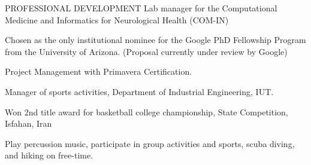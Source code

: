 \documentclass{resume} %
\begin{document}
%




\begin{rSection}{PROFESSIONAL DEVELOPMENT} \itemsep -4pt
Lab manager for the Computational Medicine and Informatics for Neurological Health (COM-IN)
\item Chosen as the only institutional nominee for the Google PhD Fellowship Program from the University of Arizona. (Proposal currently under review by Google)
\item Project Management with Primavera Certification.
\item Manager of sports activities, Department of Industrial Engineering, IUT.
\item Won 2nd title award for basketball college championship, State Competition, Isfahan, Iran
\item Play percussion music, participate in group activities and sports, scuba diving, and hiking on free-time.

\end{rSection}
\end{document}
